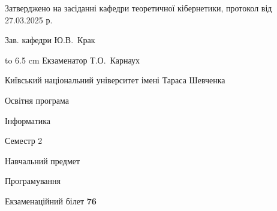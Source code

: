 \documentclass[12pt, ukrainian]{article}
\begin{document}
{\smallskip\smallskip \begin {scriptsize} Затверджено на засіданні кафедри теоретичної кібернетики, протокол   від   27.03.2025 р.\par\smallskip\smallskip\smallskip\smallskip
{\parbox {6.5 cm} {Зав. кафедри \dotfill Ю.В.~Крак}}\hspace {0.7cm} {\hbox to 6.5 cm { Екзаменатор \dotfill Т.О.~Карнаух}} \end{scriptsize}}
\newpage
{{\begin {scriptsize}\par
{ \center  Київський національний університет імені Тараса Шевченка \par}
{\parbox {5 cm}{Освітня програма \hfill}{\parbox {7 cm}{Інформатика\hfill}}\parbox {6 cm}{\hfill Семестр 2}}\par
{\parbox {5 cm} {Навчальний предмет \hfill}\parbox {7 cm}{Програмування \hfill}\parbox {6cm}{\hfill}\par}\vspace{-15pt} \end{scriptsize}}{\center Екзаменаційний білет \No \textbf { 76 }\par}}
\end{document}
